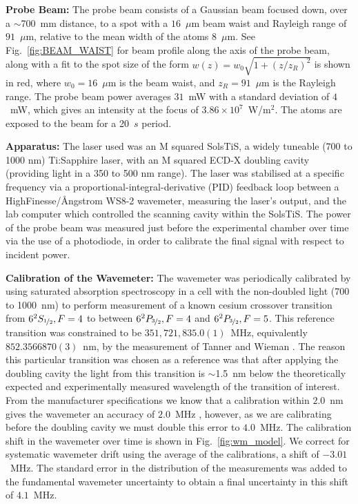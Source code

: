 \documentclass[%
 amsmath,amssymb,
aps,
]{revtex4-2}
\begin{document}
\textbf{Probe Beam:} The probe beam consists of a Gaussian beam focused down, over a $\sim$700~mm distance, to a spot with a \(16\)~\(\mu\)m beam waist and Rayleigh range of \(91\)~\(\mu\)m, relative to the mean width of the atoms \(8\)~\(\mu\)m. See Fig.~\ref{fig:BEAM_WAIST} for beam profile along the axis of the probe beam, along with a fit to the spot size of the form \(w(z) = w_0 \sqrt{1+(z/z_R)^2}\) is shown in red, where \(w_0=16\)~\(\mu\)m is the beam waist, and \(z_R=91\)~\(\mu\)m is the Rayleigh range. The probe beam power averages \(31\)~mW with a standard deviation of \(4\)~mW, which gives an intensity at the focus of \(3.86 \times 10^7\)~W/m\(^2\). The atoms are exposed to the beam for a 20~\(s\) period.

\textbf{Apparatus:} The laser used was an M squared SolsTiS, a widely tuneable (700 to 1000 nm) Ti:Sapphire laser, with an M squared ECD-X doubling cavity (providing light in a 350 to 500 nm range). The laser was stabilised at a specific frequency via a proportional-integral-derivative (PID) feedback loop between a HighFinesse/\r{A}ngstrom WS8-2 wavemeter, measuring the laser's output, and the lab computer which controlled the scanning cavity within the SolsTiS. The power of the probe beam was measured just before the experimental chamber over time via the use of a photodiode, in order to calibrate the final signal with respect to incident power. 


\textbf{Calibration of the Wavemeter:} The wavemeter was periodically calibrated by using saturated absorption spectroscopy in a cell with the non-doubled light (700 to 1000~nm) to perform  measurement of a known cesium crossover transition from \(6^2S_{\nicefrac{1}{2}}, F=4\) to between \(6^2P_{\nicefrac{3}{2}}, F=4\) and \(6^2P_{\nicefrac{3}{2}}, F=5\). This reference transition was constrained to be \(351,721,835.0(1)\)~MHz, equivalently \(852.3566870(3)\)~nm, by the measurement of Tanner and Wieman \cite{pmid9900545}. The reason this particular transition was chosen as a reference was that after applying the doubling cavity the light from this transition is \(\sim\)1.5~nm below the theoretically expected and experimentally measured wavelength of the transition of interest. From the manufacturer specifications we know that a calibration within \(2.0\)~nm gives the wavemeter an accuracy of \(2.0\)~MHz \cite{wstechnical}, however, as we are calibrating before the doubling cavity we must double this error to \(4.0\)~MHz.
The calibration shift in the wavemeter over time is shown in Fig.~\ref{fig:wm_model}. We correct for systematic wavemeter drift using the average of the calibrations, a shift of \(-3.01\)~MHz. The standard error in the distribution of the measurements was added to the fundamental wavemeter uncertainty to obtain a final uncertainty in this shift of \(4.1\)~MHz.  
\end{document}
